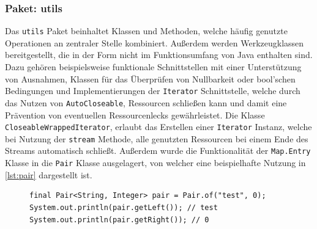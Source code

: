 \subsubsection{Paket: utils}
Das \texttt{utils} Paket beinhaltet Klassen und Methoden, welche häufig genutzte Operationen an zentraler Stelle kombiniert. Außerdem werden Werkzeugklassen bereitgestellt, die in der Form nicht im Funktionsumfang von Java enthalten sind. Dazu gehören beispielsweise funktionale Schnittstellen mit einer Unterstützung von Ausnahmen, Klassen für das Überprüfen von Nullbarkeit oder bool'schen Bedingungen und Implementierungen der \texttt{Iterator} Schnittstelle, welche durch das Nutzen von \texttt{AutoCloseable}, Ressourcen schließen kann und damit eine Prävention von eventuellen Ressourcenlecks gewährleistet. Die Klasse \texttt{CloseableWrappedIterator}, erlaubt das Erstellen einer \texttt{Iterator} Instanz, welche bei Nutzung der \texttt{stream} Methode, alle genutzten Ressourcen bei einem Ende des Streams automatisch schließt. Außerdem wurde die Funktionalität der \texttt{Map.Entry} Klasse in die \texttt{Pair} Klasse ausgelagert, von welcher eine beispielhafte Nutzung in \autoref{lst:pair} dargestellt ist.
\begin{figure}[H]
	\begin{lstlisting}[caption=Beispiel -- Nutzung der \texttt{Pair} Klasse., captionpos=b, label=lst:pair]
final Pair<String, Integer> pair = Pair.of("test", 0);
System.out.println(pair.getLeft()); // test
System.out.println(pair.getRight()); // 0
	\end{lstlisting}
\end{figure}
